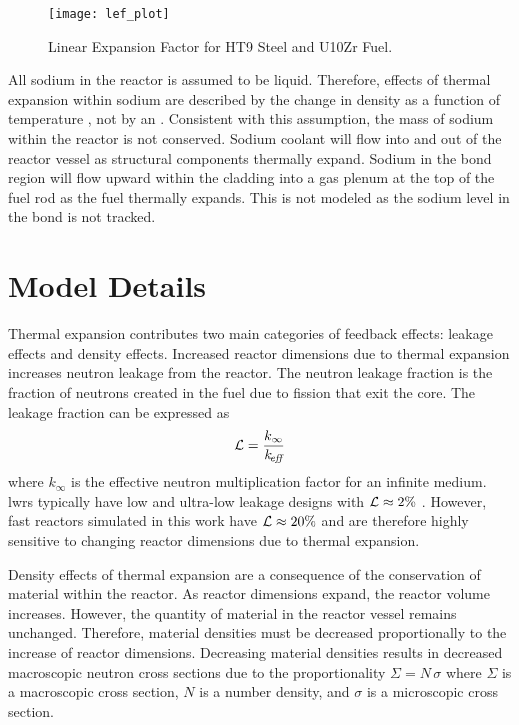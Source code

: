   \begin{figure}
    \centering
    \texttt{[image: lef\_plot]}
    \caption{Linear Expansion Factor for HT9 Steel and U10Zr Fuel.}
    \label{fig:lef_plot}
  \end{figure}

  All sodium in the reactor is assumed to be liquid.  Therefore, effects of
  thermal expansion within sodium are described by the change in density as a
  function of temperature \cite{sodiumProp}, not by an . 
  Consistent with this assumption, the mass of sodium within the reactor is not
  conserved. Sodium coolant will flow into and out of the reactor vessel as
  structural components thermally expand. Sodium in the bond region will flow
  upward within the cladding into a gas plenum at the top of the fuel rod as the
  fuel thermally expands. This is not modeled as the sodium level in the bond is
  not tracked.
    
\section{Model Details}
  \label{sec:model_details}
  Thermal expansion contributes two main categories of feedback effects: leakage
  effects and density effects. Increased reactor dimensions due to thermal
  expansion increases neutron leakage from the reactor. The neutron leakage
  fraction is the fraction of neutrons created in the fuel due to fission that
  exit the core. The leakage fraction can be expressed as
  \begin{equation}
    \label{eq:leakage}
    \mathcal{L} = \frac{k_{\infty}}{k_{\!\mbox{\scriptsize \em eff}}}
  \end{equation}
  where $k_{\infty}$ is the effective neutron multiplication factor for an
  infinite medium. \glspl{lwr} typically have low and ultra-low leakage
  designs with $\mathcal{L} \approx 2 \%$ \cite{textbookknief}. However, fast
  reactors simulated in this work have $\mathcal{L} \approx 20\%$ and are
  therefore highly sensitive to changing reactor dimensions due to thermal 
  expansion.

  Density effects of thermal expansion are a consequence of the conservation of
  material within the reactor. As reactor dimensions expand, the reactor volume
  increases. However, the quantity of material in the reactor vessel remains 
  unchanged. Therefore, material densities must be decreased proportionally to
  the increase of reactor dimensions. Decreasing material densities results in
  decreased macroscopic neutron cross sections due to the proportionality
  $\Sigma = N \, \sigma$ where $\Sigma$ is a macroscopic cross section, $N$ is a
  number density, and $\sigma$ is a microscopic cross section.

